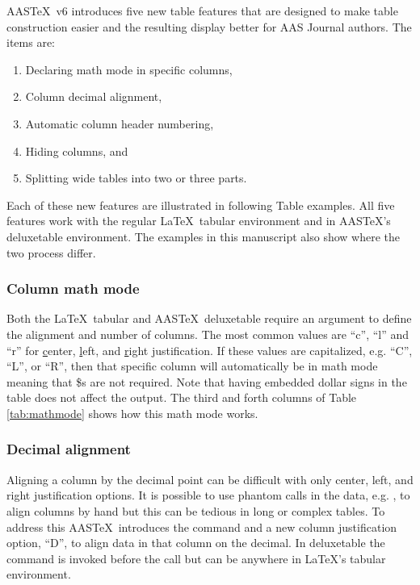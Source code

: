 \documentclass{aastex62}
\newcommand\aastex{AAS\TeX}
\newcommand\latex{La\TeX}
\begin{document}
\aastex\ v6 introduces five new table features that are designed to make
table construction easier and the resulting display better for AAS Journal
authors.  The items are:

\begin{enumerate}
\item Declaring math mode in specific columns,
\item Column decimal alignment, 
\item Automatic column header numbering,
\item Hiding columns, and
\item Splitting wide tables into two or three parts.
\end{enumerate}

Each of these new features are illustrated in following Table examples.
All five features work with the regular \latex\ tabular environment and in
\aastex's deluxetable environment.  The examples in this manuscript also
show where the two process differ.

\subsubsection{Column math mode}

Both the \latex\ tabular and \aastex\ deluxetable require an argument to
define the alignment and number of columns.  The most common values are
``c'', ``l'' and ``r'' for \underline{c}enter, \underline{l}eft, and
\underline{r}ight justification.  If these values are capitalized, e.g.
``C'', ``L'', or ``R'', then that specific column will automatically be in math
mode meaning that \$s are not required.  Note that having embedded dollar
signs in the table does not affect the output.  The third and forth columns
of Table \ref{tab:mathmode} shows how this math mode works.

\subsubsection{Decimal alignment}

Aligning a column by the decimal point can be difficult with only center,
left, and right justification options.  It is possible to use phantom calls
in the data, e.g. {\tt\string\phn}, to align columns by hand but this can
be tedious in long or complex tables.  To address this \aastex\ introduces
the {\tt\string\decimals} command and a new column justification option,
``D'', to align data in that column on the decimal.  In deluxetable the
{\tt\string\decimals} command is invoked before the {\tt\string\startdata}
call but can be anywhere in \latex's tabular environment.  
\end{document}
